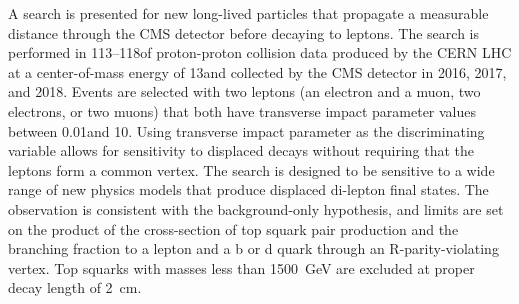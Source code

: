 
A search is presented for new long-lived particles that propagate a measurable distance through the CMS detector before decaying to leptons. The search is performed in 113--118\fbinv of proton-proton collision data produced by the CERN LHC at a center-of-mass energy of 13\TeV and collected by the CMS detector in 2016, 2017, and 2018. Events are selected with two leptons (an electron and a muon, two electrons, or two muons) that both have transverse impact parameter values between 0.01\cm and 10\cm. Using transverse impact parameter as the discriminating variable allows for sensitivity to displaced decays without requiring that the leptons form a common vertex. The search is designed to be sensitive to a wide range of new physics models that produce displaced di-lepton final states. The observation is consistent with the background-only hypothesis, and limits are set on the product of the cross-section of top squark pair production and the branching fraction to a lepton and a b or d quark through an R-parity-violating vertex. Top squarks with masses less than \SI{1500}{\GeV} are excluded at proper decay length of \SI{2}{\cm}.

